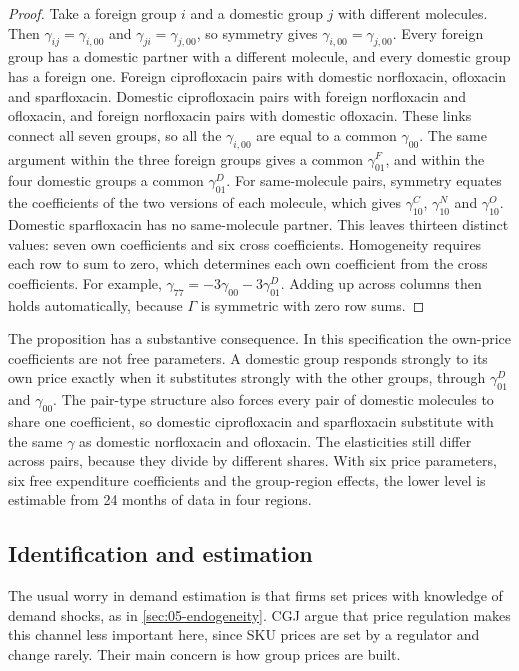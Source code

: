 \begin{proof}
Take a foreign group $i$ and a domestic group $j$ with different molecules. Then $\gamma_{ij} = \gamma_{i,00}$ and
$\gamma_{ji} = \gamma_{j,00}$, so symmetry gives $\gamma_{i,00} = \gamma_{j,00}$. Every foreign group has a domestic
partner with a different molecule, and every domestic group has a foreign one. Foreign ciprofloxacin pairs with
domestic norfloxacin, ofloxacin and sparfloxacin. Domestic ciprofloxacin pairs with foreign norfloxacin and ofloxacin,
and foreign norfloxacin pairs with domestic ofloxacin. These links connect all seven groups, so all the
$\gamma_{i,00}$ are equal to a common $\gamma_{00}$.
The same argument within the three foreign groups gives a common $\gamma^{F}_{01}$, and within the four domestic
groups a common $\gamma^{D}_{01}$. For same-molecule pairs, symmetry equates the coefficients of the two versions of
each molecule, which gives $\gamma^{C}_{10}$, $\gamma^{N}_{10}$ and $\gamma^{O}_{10}$. Domestic sparfloxacin has no
same-molecule partner. This leaves thirteen distinct values: seven own coefficients and six cross coefficients.
Homogeneity requires each row to sum to zero, which determines each own coefficient from the cross coefficients. For
example, $\gamma_{77} = -3\gamma_{00} - 3\gamma^{D}_{01}$. Adding up across columns then holds automatically, because
$\Gamma$ is symmetric with zero row sums.
\end{proof}

The proposition has a substantive consequence. In this specification the own-price coefficients are not free
parameters. A domestic group responds strongly to its own price exactly when it substitutes strongly with the other
groups, through $\gamma^{D}_{01}$ and $\gamma_{00}$. The pair-type structure also forces every pair of domestic
molecules to share one coefficient, so domestic ciprofloxacin and sparfloxacin substitute with the same $\gamma$ as
domestic norfloxacin and ofloxacin. The elasticities still differ across pairs, because they divide by different
shares. With six price parameters, six free expenditure coefficients and the group-region effects, the lower level is
estimable from 24 months of data in four regions.

\subsection{Identification and estimation}\label{sec:05-cgj-identification}

The usual worry in demand estimation is that firms set prices with knowledge of demand shocks, as in
\cref{sec:05-endogeneity}. CGJ argue that price regulation makes this channel less important here, since SKU prices
are set by a regulator and change rarely. Their main concern is how group prices are built.

